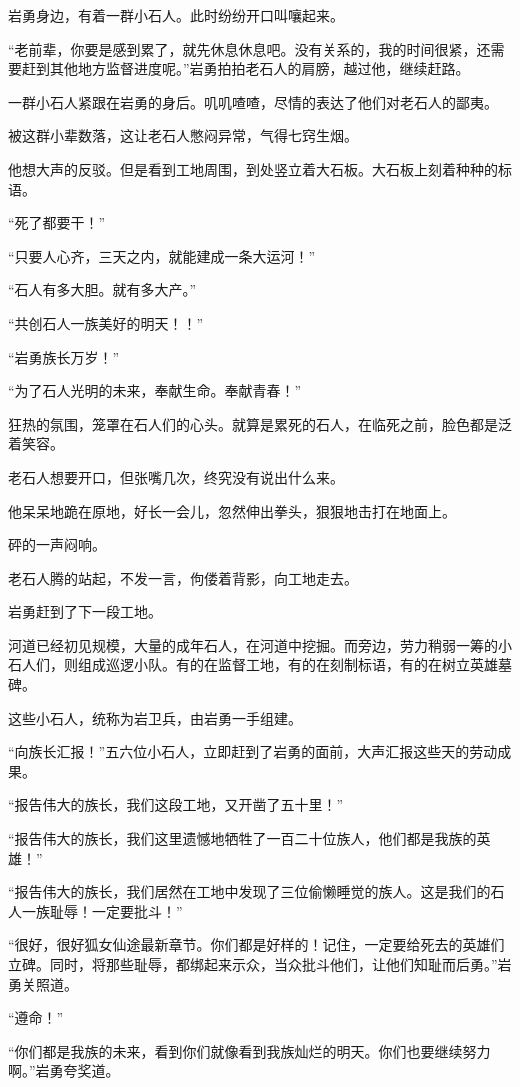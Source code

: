 \begin{this_body}
岩勇身边，有着一群小石人。此时纷纷开口叫嚷起来。

“老前辈，你要是感到累了，就先休息休息吧。没有关系的，我的时间很紧，还需要赶到其他地方监督进度呢。”岩勇拍拍老石人的肩膀，越过他，继续赶路。

一群小石人紧跟在岩勇的身后。叽叽喳喳，尽情的表达了他们对老石人的鄙夷。

被这群小辈数落，这让老石人憋闷异常，气得七窍生烟。

他想大声的反驳。但是看到工地周围，到处竖立着大石板。大石板上刻着种种的标语。

“死了都要干！”

“只要人心齐，三天之内，就能建成一条大运河！”

“石人有多大胆。就有多大产。”

“共创石人一族美好的明天！！”

“岩勇族长万岁！”

“为了石人光明的未来，奉献生命。奉献青春！”

狂热的氛围，笼罩在石人们的心头。就算是累死的石人，在临死之前，脸色都是泛着笑容。

老石人想要开口，但张嘴几次，终究没有说出什么来。

他呆呆地跪在原地，好长一会儿，忽然伸出拳头，狠狠地击打在地面上。

砰的一声闷响。

老石人腾的站起，不发一言，佝偻着背影，向工地走去。

岩勇赶到了下一段工地。

河道已经初见规模，大量的成年石人，在河道中挖掘。而旁边，劳力稍弱一筹的小石人们，则组成巡逻小队。有的在监督工地，有的在刻制标语，有的在树立英雄墓碑。

这些小石人，统称为岩卫兵，由岩勇一手组建。

“向族长汇报！”五六位小石人，立即赶到了岩勇的面前，大声汇报这些天的劳动成果。

“报告伟大的族长，我们这段工地，又开凿了五十里！”

“报告伟大的族长，我们这里遗憾地牺牲了一百二十位族人，他们都是我族的英雄！”

“报告伟大的族长，我们居然在工地中发现了三位偷懒睡觉的族人。这是我们的石人一族耻辱！一定要批斗！”

“很好，很好狐女仙途最新章节。你们都是好样的！记住，一定要给死去的英雄们立碑。同时，将那些耻辱，都绑起来示众，当众批斗他们，让他们知耻而后勇。”岩勇关照道。

“遵命！”

“你们都是我族的未来，看到你们就像看到我族灿烂的明天。你们也要继续努力啊。”岩勇夸奖道。


\end{this_body}
